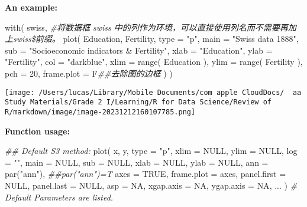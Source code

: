 \documentclass[
]{article}
\let\oldincludegraphics\includegraphics
\renewcommand{\includegraphics}[2][]{\begin{center}\oldincludegraphics[#1]{#2}\end{center}}
\newenvironment{Shaded}{}{}
\newcommand{\AttributeTok}[1]{\textcolor[rgb]{0.49,0.56,0.16}{#1}}
\newcommand{\CommentTok}[1]{\textcolor[rgb]{0.38,0.63,0.69}{\textit{#1}}}
\newcommand{\ConstantTok}[1]{\textcolor[rgb]{0.53,0.00,0.00}{#1}}
\newcommand{\DecValTok}[1]{\textcolor[rgb]{0.25,0.63,0.44}{#1}}
\newcommand{\DocumentationTok}[1]{\textcolor[rgb]{0.73,0.13,0.13}{\textit{#1}}}
\newcommand{\FunctionTok}[1]{\textcolor[rgb]{0.02,0.16,0.49}{#1}}
\newcommand{\NormalTok}[1]{#1}
\newcommand{\StringTok}[1]{\textcolor[rgb]{0.25,0.44,0.63}{#1}}
\begin{document}
\textbf{An example:}

\begin{Shaded}
\begin{Highlighting}[]
\FunctionTok{with}\NormalTok{( }
\NormalTok{  swiss,}
  \CommentTok{\#将数据框 swiss 中的列作为环境，可以直接使用列名而不需要再加上swiss\$前缀。 }
  \FunctionTok{plot}\NormalTok{(}
\NormalTok{    Education, }
\NormalTok{    Fertility,}
    \AttributeTok{type =} \StringTok{"p"}\NormalTok{, }
    \AttributeTok{main =} \StringTok{"Swiss data 1888"}\NormalTok{, }
    \AttributeTok{sub =} \StringTok{"Socioeconomic indicators \& Fertility"}\NormalTok{, }
    \AttributeTok{xlab =} \StringTok{"Education"}\NormalTok{, }
    \AttributeTok{ylab =} \StringTok{"Fertility"}\NormalTok{, }
    \AttributeTok{col =} \StringTok{"darkblue"}\NormalTok{, }
    \AttributeTok{xlim =} \FunctionTok{range}\NormalTok{( Education ), }
    \AttributeTok{ylim =} \FunctionTok{range}\NormalTok{( Fertility ), }
    \AttributeTok{pch =} \DecValTok{20}\NormalTok{, }
    \AttributeTok{frame.plot =}\NormalTok{ F}\DocumentationTok{\#\#去除图的边框}
\NormalTok{  ) }
\NormalTok{)}
\end{Highlighting}
\end{Shaded}

\texttt{[image: /Users/lucas/Library/Mobile Documents/com~apple~CloudDocs/~~aa Study Materials/Grade 2 I/Learning/R for Data Science/Review of R/markdown/image/image-20231212160107785.png]}

\textbf{Function usage:}

\begin{Shaded}
\begin{Highlighting}[]
\DocumentationTok{\#\# Default S3 method:}
\FunctionTok{plot}\NormalTok{(}
\NormalTok{  x, }
\NormalTok{  y, }
  \AttributeTok{type =} \StringTok{"p"}\NormalTok{, }
  \AttributeTok{xlim =} \ConstantTok{NULL}\NormalTok{, }\AttributeTok{ylim =} \ConstantTok{NULL}\NormalTok{,}
  \AttributeTok{log =} \StringTok{""}\NormalTok{, }
  \AttributeTok{main =} \ConstantTok{NULL}\NormalTok{, }\AttributeTok{sub =} \ConstantTok{NULL}\NormalTok{, }
  \AttributeTok{xlab =} \ConstantTok{NULL}\NormalTok{, }\AttributeTok{ylab =} \ConstantTok{NULL}\NormalTok{,}
  \AttributeTok{ann =} \FunctionTok{par}\NormalTok{(}\StringTok{"ann"}\NormalTok{), }\DocumentationTok{\#\#par("ann")=T}
  \AttributeTok{axes =} \ConstantTok{TRUE}\NormalTok{, }\AttributeTok{frame.plot =}\NormalTok{ axes,}
  \AttributeTok{panel.first =} \ConstantTok{NULL}\NormalTok{, }\AttributeTok{panel.last =} \ConstantTok{NULL}\NormalTok{, }\AttributeTok{asp =} \ConstantTok{NA}\NormalTok{,}
  \AttributeTok{xgap.axis =} \ConstantTok{NA}\NormalTok{, }\AttributeTok{ygap.axis =} \ConstantTok{NA}\NormalTok{,}
\NormalTok{  ...}
\NormalTok{)}
\CommentTok{\# Default Parameters are listed.}
\end{Highlighting}
\end{Shaded}
\end{document}

